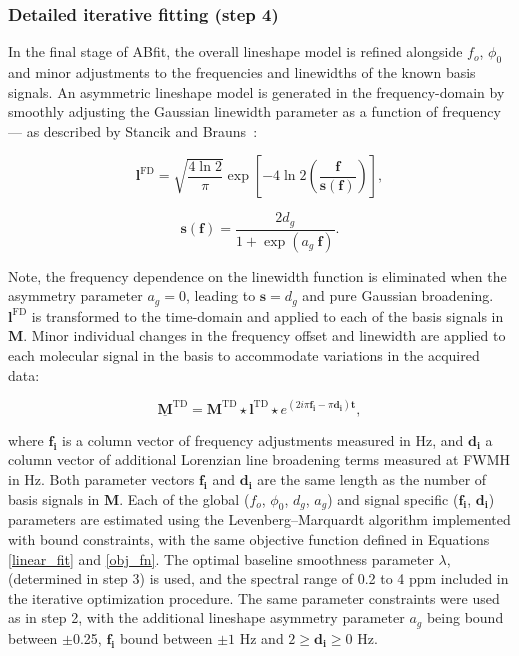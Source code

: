 \documentclass[num-refs]{wiley-article}
\begin{document}
\subsubsection{Detailed iterative fitting (step 4)}
In the final stage of ABfit, the overall lineshape model is refined alongside $f_{o}$, $\phi_{0}$ and minor adjustments to the frequencies and linewidths of the known basis signals. An asymmetric lineshape model is generated in the frequency-domain by smoothly adjusting the Gaussian linewidth parameter as a function of frequency --- as described by Stancik and Brauns~\cite{Stancik2008}:

\begin{equation}
  \mathbf{l}^{\mathrm{FD}} = \sqrt{\frac{4 \ln 2}{\pi}} \exp \left[ -4 \ln2 \left( \frac{\mathbf{f}}{\mathbf{s}(\mathbf{f})} \right) \right],
\end{equation}

\begin{equation}
  \mathbf{s}(\mathbf{f}) = \frac{2 d_{g}}{1 + \exp(a_{g} \ \mathbf{f})}.
\end{equation}

Note, the frequency dependence on the linewidth function is eliminated when the asymmetry parameter $a_{g}=0$, leading to $\mathbf{s}=d_{g}$ and pure Gaussian broadening. $\mathbf{l}^{\mathrm{FD}}$ is transformed to the time-domain and applied to each of the basis signals in $\mathbf{M}$. Minor individual changes in the frequency offset and linewidth are applied to each molecular signal in the basis to accommodate variations in the acquired data:

\begin{equation}
    \underline{\mathbf{M}}^{\mathrm{TD}} = \mathbf{M}^{\mathrm{TD}} \star \mathbf{l}^{\mathrm{TD}} \star e^{(2i \pi \mathbf{f_{i}} - \pi \mathbf{d_{i}} ) \mathbf{t}},
\end{equation}

where $\mathbf{f_{i}}$ is a column vector of frequency adjustments measured in Hz, and $\mathbf{d_{i}}$ a column vector of additional Lorenzian line broadening terms measured at FWMH in Hz. Both parameter vectors $\mathbf{f_{i}}$ and $\mathbf{d_{i}}$ are the same length as the number of basis signals in $\mathbf{M}$. Each of the global ($f_{o}$, $\phi_{0}$, $d_{g}$, $a_{g}$) and signal specific ($\mathbf{f_{i}}$, $\mathbf{d_{i}}$) parameters are estimated using the Levenberg–Marquardt algorithm \cite{Levenberg1944} implemented with bound constraints, with the same objective function defined in Equations \ref{linear_fit} and \ref{obj_fn}. The optimal baseline smoothness parameter $\lambda$, (determined in step 3) is used, and the spectral range of 0.2 to 4 ppm included in the iterative optimization procedure. The same parameter constraints were used as in step 2, with the additional lineshape asymmetry parameter $a_{g}$ being bound between $\pm$0.25, $\mathbf{f_{i}}$ bound between $\pm1$ Hz and  $2 \geq \mathbf{d_{i}} \geq 0$ Hz.
\end{document}
